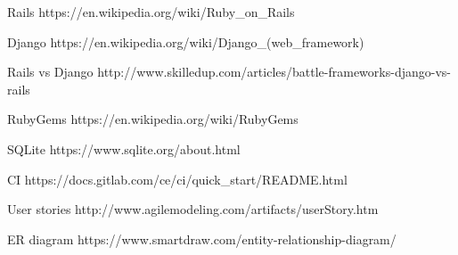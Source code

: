 \documentclass{l3proj}
\begin{document}



\label{tech}
Rails
https://en.wikipedia.org/wiki/Ruby_on_Rails

Django
https://en.wikipedia.org/wiki/Django_(web_framework)

Rails vs Django
http://www.skilledup.com/articles/battle-frameworks-django-vs-rails

RubyGems
https://en.wikipedia.org/wiki/RubyGems

SQLite
https://www.sqlite.org/about.html

\label{testing}
CI 
https://docs.gitlab.com/ce/ci/quick_start/README.html

\label{user_stories}

User stories
http://www.agilemodeling.com/artifacts/userStory.htm


\label{er}
ER diagram
https://www.smartdraw.com/entity-relationship-diagram/
\end{document}
